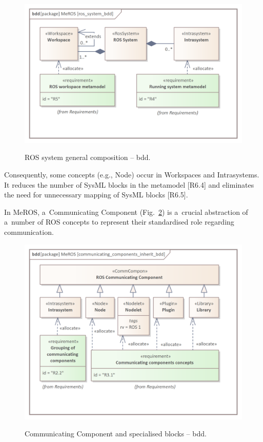 \documentclass{ieeeaccess}
\begin{document}
	\begin{figure}[htb]
		\centering
		\begin{center}
			{\includegraphics[scale=0.7]{img/meros_pkg/ros_system_bdd.png}}
		\end{center}
		\caption{ROS system general composition -- bdd.} 
		\label{fig:ros_system_bdd}
	\end{figure}
	
	Consequently, some concepts (e.g., Node) occur in Workspaces and Intrasystems. It reduces the number of SysML blocks in the metamodel [R6.4] and eliminates the need for unnecessary mapping of SysML blocks [R6.5].
		
	In MeROS, a~Communicating Component (Fig.~\ref{fig:communicating_components_bdd}) is a~crucial abstraction of a~number of ROS concepts to represent their standardised role regarding communication. 
	
	\begin{figure}[htb]
		\centering
		\begin{center}
			{\includegraphics[scale=0.7]{img/meros_pkg/communicating_components_inherit_bdd.png}}
		\end{center}
		\caption{Communicating Component and specialised blocks -- bdd.} 
		\label{fig:communicating_components_bdd}
	\end{figure}
	
\end{document}
